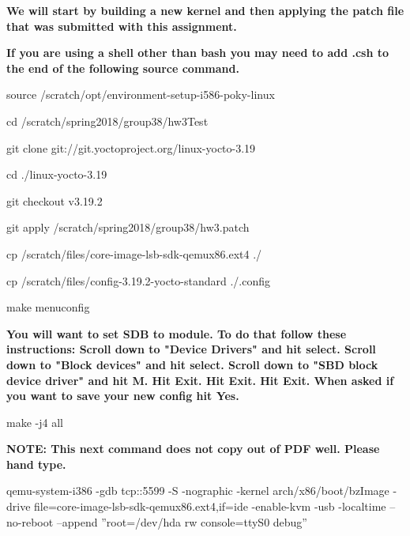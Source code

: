 \documentclass[journal,10pt,onecolumn,letterpaper,draftclsnofoot]{IEEEtran}
\begin{document}
\textbf{We will start by building a new kernel and then applying the patch file that was submitted with this assignment.\newline}

\textbf{If you are using a shell other than bash you may need to add .csh to the end of the following source command.\newline}

source /scratch/opt/environment-setup-i586-poky-linux\newline

cd /scratch/spring2018/group38/hw3Test\newline

git clone git://git.yoctoproject.org/linux-yocto-3.19\newline

cd ./linux-yocto-3.19\newline

git checkout v3.19.2\newline

git apply /scratch/spring2018/group38/hw3.patch\newline

cp /scratch/files/core-image-lsb-sdk-qemux86.ext4 ./\newline

cp /scratch/files/config-3.19.2-yocto-standard ./.config\newline

make menuconfig\newline

\textbf{You will want to set SDB to module. To do that follow these instructions:\newline
Scroll down to "Device Drivers" and hit select.\newline
Scroll down to "Block devices" and hit select.\newline
Scroll down to "SBD block device driver" and hit M.\newline
Hit Exit.\newline
Hit Exit.\newline
Hit Exit.\newline
When asked if you want to save your new config hit Yes.\newline
}

make -j4 all\newline

\textbf{NOTE: This next command does not copy out of PDF well. Please hand type.\newline}

qemu-system-i386 -gdb tcp::5599 -S -nographic -kernel arch/x86/boot/bzImage -drive file=core-image-lsb-sdk-qemux86.ext4,if=ide -enable-kvm -usb -localtime –no-reboot –append ”root=/dev/hda rw console=ttyS0 debug”\newline
\end{document}
